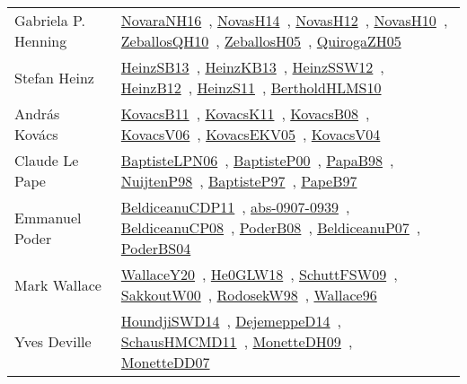 {\begin{longtable}{p{4cm}p{20cm}}
Gabriela P. Henning & \href{works/NovaraNH16.pdf}{NovaraNH16}~\cite{NovaraNH16}, \href{works/NovasH14.pdf}{NovasH14}~\cite{NovasH14}, \href{works/NovasH12.pdf}{NovasH12}~\cite{NovasH12}, \href{works/NovasH10.pdf}{NovasH10}~\cite{NovasH10}, \href{works/ZeballosQH10.pdf}{ZeballosQH10}~\cite{ZeballosQH10}, \href{works/ZeballosH05.pdf}{ZeballosH05}~\cite{ZeballosH05}, \href{works/QuirogaZH05.pdf}{QuirogaZH05}~\cite{QuirogaZH05}\\
Stefan Heinz & \href{works/HeinzSB13.pdf}{HeinzSB13}~\cite{HeinzSB13}, \href{works/HeinzKB13.pdf}{HeinzKB13}~\cite{HeinzKB13}, \href{works/HeinzSSW12.pdf}{HeinzSSW12}~\cite{HeinzSSW12}, \href{works/HeinzB12.pdf}{HeinzB12}~\cite{HeinzB12}, \href{works/HeinzS11.pdf}{HeinzS11}~\cite{HeinzS11}, \href{works/BertholdHLMS10.pdf}{BertholdHLMS10}~\cite{BertholdHLMS10}\\
Andr{\'{a}}s Kov{\'{a}}cs & \href{works/KovacsB11.pdf}{KovacsB11}~\cite{KovacsB11}, \href{works/KovacsK11.pdf}{KovacsK11}~\cite{KovacsK11}, \href{works/KovacsB08.pdf}{KovacsB08}~\cite{KovacsB08}, \href{works/KovacsV06.pdf}{KovacsV06}~\cite{KovacsV06}, \href{works/KovacsEKV05.pdf}{KovacsEKV05}~\cite{KovacsEKV05}, \href{works/KovacsV04.pdf}{KovacsV04}~\cite{KovacsV04}\\
Claude Le Pape & \href{}{BaptisteLPN06}~\cite{BaptisteLPN06}, \href{works/BaptisteP00.pdf}{BaptisteP00}~\cite{BaptisteP00}, \href{works/PapaB98.pdf}{PapaB98}~\cite{PapaB98}, \href{works/NuijtenP98.pdf}{NuijtenP98}~\cite{NuijtenP98}, \href{works/BaptisteP97.pdf}{BaptisteP97}~\cite{BaptisteP97}, \href{}{PapeB97}~\cite{PapeB97}\\
Emmanuel Poder & \href{works/BeldiceanuCDP11.pdf}{BeldiceanuCDP11}~\cite{BeldiceanuCDP11}, \href{works/abs-0907-0939.pdf}{abs-0907-0939}~\cite{abs-0907-0939}, \href{works/BeldiceanuCP08.pdf}{BeldiceanuCP08}~\cite{BeldiceanuCP08}, \href{works/PoderB08.pdf}{PoderB08}~\cite{PoderB08}, \href{works/BeldiceanuP07.pdf}{BeldiceanuP07}~\cite{BeldiceanuP07}, \href{works/PoderBS04.pdf}{PoderBS04}~\cite{PoderBS04}\\
Mark Wallace & \href{works/WallaceY20.pdf}{WallaceY20}~\cite{WallaceY20}, \href{works/He0GLW18.pdf}{He0GLW18}~\cite{He0GLW18}, \href{works/SchuttFSW09.pdf}{SchuttFSW09}~\cite{SchuttFSW09}, \href{works/SakkoutW00.pdf}{SakkoutW00}~\cite{SakkoutW00}, \href{works/RodosekW98.pdf}{RodosekW98}~\cite{RodosekW98}, \href{works/Wallace96.pdf}{Wallace96}~\cite{Wallace96}\\
Yves Deville & \href{works/HoundjiSWD14.pdf}{HoundjiSWD14}~\cite{HoundjiSWD14}, \href{works/DejemeppeD14.pdf}{DejemeppeD14}~\cite{DejemeppeD14}, \href{works/SchausHMCMD11.pdf}{SchausHMCMD11}~\cite{SchausHMCMD11}, \href{works/MonetteDH09.pdf}{MonetteDH09}~\cite{MonetteDH09}, \href{works/MonetteDD07.pdf}{MonetteDD07}~\cite{MonetteDD07}\\

\end{longtable}}
